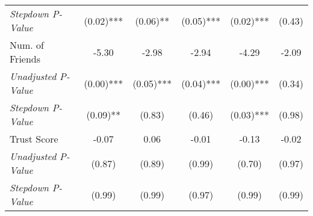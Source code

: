 \begin{tabular}{l c c c c c}
\quad \textit{Stepdown P-Value} & (0.02)*** & (0.06)** & (0.05)*** & (0.02)*** & (0.43) \\
Num. of Friends & -5.30 & -2.98 & -2.94 & -4.29 & -2.09 \\
\quad \textit{Unadjusted P-Value} & (0.00)*** & (0.05)*** & (0.04)*** & (0.00)*** & (0.34) \\
\quad \textit{Stepdown P-Value} & (0.09)** & (0.83) & (0.46) & (0.03)*** & (0.98) \\
Trust Score & -0.07 & 0.06 & -0.01 & -0.13 & -0.02 \\
\quad \textit{Unadjusted P-Value} & (0.87) & (0.89) & (0.99) & (0.70) & (0.97) \\
\quad \textit{Stepdown P-Value} & (0.99) & (0.99) & (0.97) & (0.99) & (0.99) \\
\bottomrule
\end{tabular}
